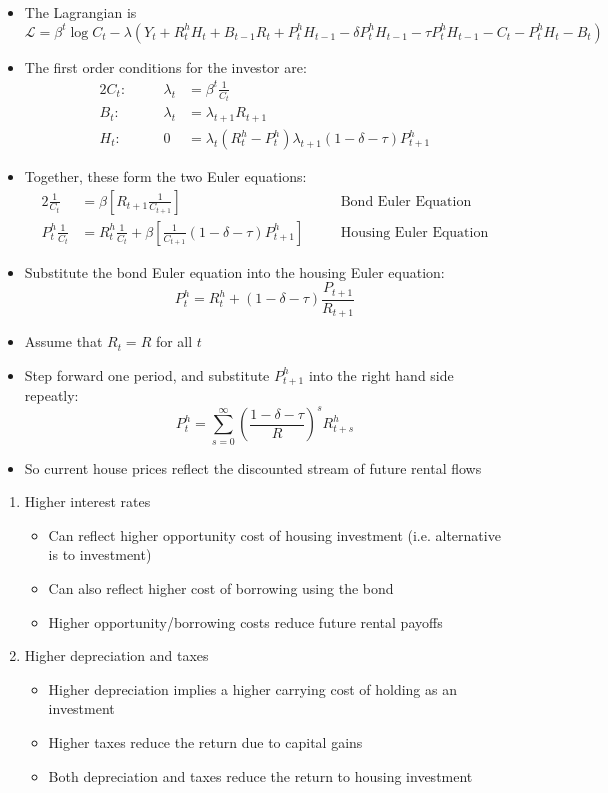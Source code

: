 \documentclass[a4paper,twoside]{article}
\newif\IfInSansMode
\numberwithin{equation}{section}
\numberwithin{figure}{section}
\begin{document}
\begin{itemize}
		\item The Lagrangian is
		\[
			\mathcal{L} = \beta^t\log C_t - \lambda(Y_t + R_t^h H_t + B_{t-1}R_t + P_t^h H_{t-1} - \delta P_t^h H_{t-1} - \tau P_t^h H_{t-1}- C_t - P_t^hH_t - B_t)
		\]
		\item The first order conditions for the investor are:
		\begin{alignat*}{2}
			C_t:\quad && \lambda_t&= \beta^t\frac{1}{C_t}\\
			B_t:\quad && \lambda_t&= \lambda_{t+1}R_{t+1}\\
			H_t:\quad && 0&= \lambda_t(R_t^h-P_t^h)\lambda_{t+1}(1-\delta-\tau)P_{t+1}^h
		\end{alignat*}
		\item Together, these form the two Euler equations:
		\begin{alignat*}{2}
			\frac{1}{C_t} &= \beta\left[R_{t+1} \frac{1}{C_{t+1}} \right] &&\text{Bond Euler Equation}\\
			P_t^h \frac{1}{C_t} &= R^h_t\frac{1}{C_t} + \beta\left[ \frac{1}{C_{t+1}} (1-\delta-\tau)P_{t+1}^h \right] \quad &&\text{Housing Euler Equation}
		\end{alignat*}
		\item Substitute the bond Euler equation into the housing Euler equation:
		\[
			P_t^h = R_t^h + (1-\delta-\tau)\frac{P_{t+1}}{R_{t+1}}
		\]
		\item Assume that \( R_t = R \) for all \( t \)
		\item Step forward one period, and substitute \( P_{t+1}^h \) into the right hand side repeatly:
		\[
			P_t^h = \sum_{s=0}^\infty \left( \frac{1-\delta-\tau}{R}\right)^s R_{t+s}^h
		\]
		\item So current house prices reflect the discounted stream of future rental flows
	\end{itemize}
	\begin{enumerate}[label=\textbf{\arabic*.}]
		\item Higher interest rates
		\begin{itemize}
			\item Can reflect higher opportunity cost of housing investment (i.e. alternative is to investment)
			\item Can also reflect higher cost of borrowing using the bond
			\item Higher opportunity/borrowing costs reduce future rental payoffs
		\end{itemize}
		\item Higher depreciation and taxes
		\begin{itemize}
			\item Higher depreciation implies a higher carrying cost of holding as an investment
			\item Higher taxes reduce the return due to capital gains
			\item Both depreciation and taxes reduce the return to housing investment
		\end{itemize}
	\end{enumerate}
\end{document}
